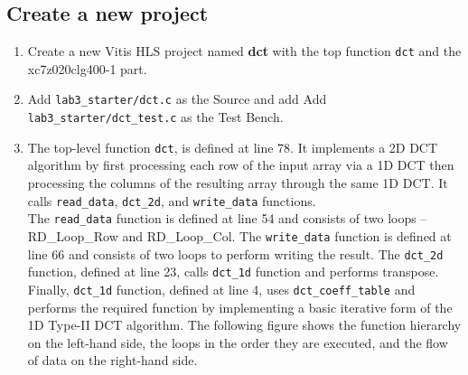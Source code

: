 \documentclass[a4paper,12pt,twoside]{article}
\begin{document}
\subsection{Create a new project}\label{S33}
\begin{enumerate}
    \item Create a new Vitis HLS project named \textbf{dct} with the top function \texttt{dct} and the xc7z020clg400-1 part.
    \item Add \texttt{lab3\_starter/dct.c} as the Source and add Add \texttt{lab3\_starter/dct\_test.c} as the Test Bench.
    \item The top-level function \texttt{dct}, is defined at line 78. It implements a 2D DCT algorithm by first processing each row of the input array via a 1D DCT then processing the columns of the resulting array through the same 1D DCT. It calls \texttt{read\_data}, \texttt{dct\_2d}, and \texttt{write\_data} functions.\\
    The \texttt{read\_data} function is defined at line 54 and consists of two loops – RD\_Loop\_Row and RD\_Loop\_Col. The \texttt{write\_data} function is defined at line 66 and consists of two loops to perform writing the result. The \texttt{dct\_2d} function, defined at line 23, calls \texttt{dct\_1d} function and performs transpose.\\
    Finally, \texttt{dct\_1d} function, defined at line 4, uses \texttt{dct\_coeff\_table} and performs the required function by implementing a basic iterative form of the 1D Type-II DCT algorithm. The following figure shows the function hierarchy on the left-hand side, the loops in the order they are executed, and the flow of data on the right-hand side.
    \begin{figure}[H]
        \centering

\end{figure}
\end{enumerate}
\end{document}
